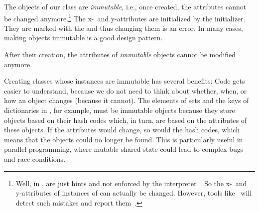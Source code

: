 The objects of our  class are \emph{immutable}, i.e., once created, the attributes cannot be changed anymore.\footnote{%
Well, in \python,  are just hints and not enforced by the interpreter~\cite{PEP591}. %
So the x\nobreakdashes-~and y\nobreakdashes-attributes of instances of  can actually be changed. %
However, tools like \mypy\ will detect such mistakes and report them~\cite{PEP591}.%
}
The x\nobreakdashes-~and y\nobreakdashes-attributes are initialized by the  initializer.
They are marked with the   and thus changing them is an error.
In many cases, making objects immutable is a good design pattern.%
%
%
%
\begin{definition}[Immutable]%
After their creation, the attributes of \emph{immutable} objects cannot be modified anymore.%
\end{definition}%
%
Creating classes whose instances are immutable has several benefits:
Code gets easier to understand, because we do not need to think about whether, when, or how an object changes (because it cannot).
The elements of sets and the keys of dictionaries in \python, for example, must be immutable objects because they store objects based on their hash codes which, in turn, are based on the attributes of these objects.
If the attributes would change, so would the hash codes, which means that the objects could no longer be found.
This is particularly useful in parallel programming, where mutable shared state could lead to complex bugs and race conditions.


